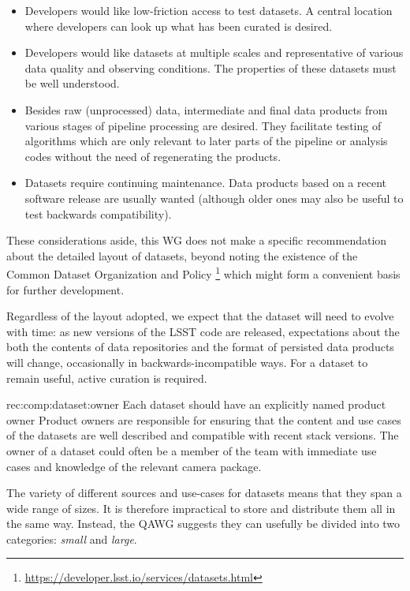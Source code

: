 \begin{itemize}
\item{
    Developers would like low-friction access to test datasets.
    A central location where developers can look up what has been curated is desired.
}
\item{
    Developers would like datasets at multiple scales and representative of various data quality and observing conditions.
    The properties of these datasets must be well understood.
}
\item{
    Besides raw (unprocessed) data, intermediate and final data products from various stages of pipeline processing are desired.
    They facilitate testing of algorithms which are only relevant to later parts of the pipeline or analysis codes without the need of regenerating the products.
}
\item{
    Datasets require continuing maintenance.
    Data products based on a recent software release are usually wanted (although older ones may also be useful to test backwards compatibility).
}
\end{itemize}

These considerations aside, this WG does not make a specific recommendation about the detailed layout of datasets, beyond noting the existence of the Common Dataset Organization and Policy \footnote{\url{https://developer.lsst.io/services/datasets.html}} which might form a convenient basis for further development.

Regardless of the layout adopted, we expect that the dataset will need to evolve with time: as new versions of the LSST code are released, expectations about the both the contents of data repositories and the format of persisted data products will change, occasionally in backwards-incompatible ways.
For a dataset to remain useful, active curation is required.

\begin{recommendation}
    {rec:comp:dataset:owner}
    {Each dataset should have an explicitly named product owner}
Product owners are responsible for ensuring that the content and use cases of the datasets are well described and compatible with recent stack versions.
The owner of a dataset could often be a member of the team with immediate use cases and knowledge of the relevant camera package.
\end{recommendation}

The variety of different sources and use-cases for datasets means that they span a wide range of sizes.
It is therefore impractical to store and distribute them all in the same way.
Instead, the QAWG suggests they can usefully be divided into two categories: \emph{small} and \emph{large}.

